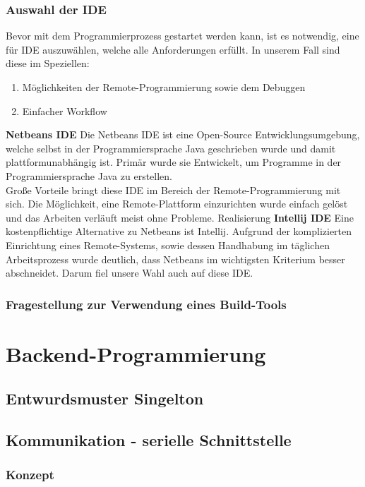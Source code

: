 \subsubsection{Auswahl der IDE}
Bevor mit dem Programmierprozess gestartet werden kann, ist es notwendig, eine für IDE auszuwählen, welche alle Anforderungen erfüllt. In unserem Fall sind diese im Speziellen:
\begin{enumerate}
    \item Möglichkeiten der Remote-Programmierung sowie dem Debuggen
    \item Einfacher Workflow
\end{enumerate}

\textbf{Netbeans IDE}
Die Netbeans IDE ist eine Open-Source Entwicklungsumgebung, welche selbst in der Programmiersprache Java geschrieben wurde und damit plattformunabhängig ist. Primär wurde sie Entwickelt, um Programme in der Programmiersprache Java zu erstellen.\\
Große Vorteile bringt diese IDE im Bereich der Remote-Programmierung mit sich. Die Möglichkeit, eine Remote-Plattform einzurichten wurde einfach gelöst und das Arbeiten verläuft meist ohne Probleme.
Realisierung
\textbf{Intellij IDE}
Eine kostenpflichtige Alternative zu Netbeans ist Intellij. Aufgrund der komplizierten Einrichtung eines Remote-Systems, sowie dessen Handhabung im täglichen Arbeitsprozess wurde deutlich, dass Netbeans im wichtigsten Kriterium besser abschneidet. Darum fiel unsere Wahl auch auf diese IDE.

\subsubsection{Fragestellung zur Verwendung eines Build-Tools}
\section{Backend-Programmierung}
\subsection{Entwurdsmuster Singelton}
\subsection{Kommunikation - serielle Schnittstelle}
\subsubsection{Konzept}

